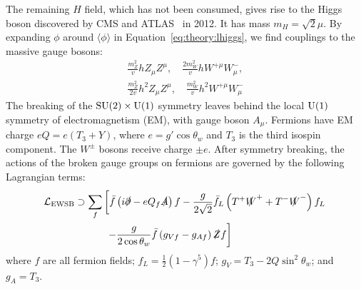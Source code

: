 The remaining $H$ field, which has not been consumed, gives rise to the Higgs boson discovered by CMS and ATLAS~\cite{higgsdisc} in 2012.
It has mass $m_H = \sqrt2\mu$.
By expanding $\phi$ around $\langle \phi \rangle$ in Equation~\ref{eq:theory:lhiggs}, we find couplings to the massive gauge bosons:
\begin{gather}
    \frac{m_Z^2}{v} hZ_\mu Z^\mu, \quad \frac{2m_W^2}{v}hW^{+\mu} W^{-}_\mu, \nonumber \\
    \frac{m_Z^2}{2v} h^2 Z_\mu Z^\mu, \quad \frac{m_W^2}{v} h^2 W^{+\mu} W^-_\mu 
\end{gather}
The breaking of the $\operatorname{\mathrm{SU}}(2)\times \operatorname{\mathrm{U}}(1)$ symmetry leaves behind the local $\operatorname{\mathrm{U}}(1)$ symmetry of electromagnetism (EM), with gauge boson $A_\mu$.
Fermions have EM charge $eQ = e(T_3+Y)$, where $e=g'\cos\theta_w$ and $T_3$ is the third isospin component. 
The $W^\pm$ bosons receive charge $\pm e$.
After symmetry breaking, the actions of the broken gauge groups on fermions are governed by the following Lagrangian terms:
\begin{align}
    \mathcal{L}_\mathrm{EWSB} \supset 
            \sum_f &\left[\bar f\left(i\slashed\partial-eQ_f\slashed A\right) f 
            - \frac{g}{2\sqrt{2}} \bar f_L \left(T^+\slashed W^+ + T^- \slashed W^-\right) f_L\right. \nonumber \\
            &\left.~- \frac{g}{2\cos\theta_w} \bar f\left(g_{Vf} - g_{Af} \right)\slashed Z f \right]
\end{align}
where $f$ are all fermion fields; $f_L = \frac{1}{2}(1-\gamma^5)f$; $g_{V} = T_3- 2Q\sin^2\theta_w$; and $g_{A} = T_3$.

